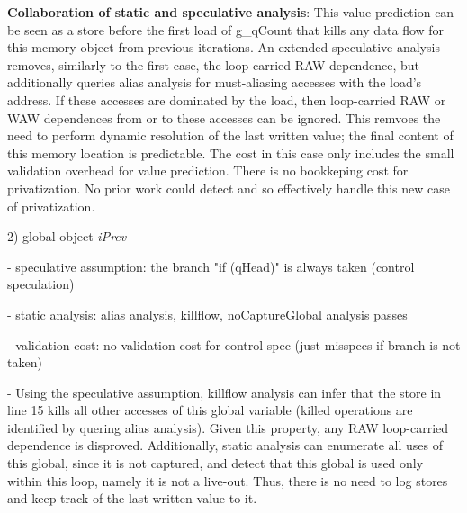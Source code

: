 \textbf{Collaboration of static and speculative analysis}:
%
This value prediction can be seen as a store before the first load of g\_qCount
that kills any data flow for this memory object from previous iterations.
%
An extended speculative analysis removes, similarly to the first case, the
loop-carried RAW dependence, but additionally queries alias analysis for
must-aliasing accesses with the load's address. If these accesses are dominated
by the load, then loop-carried RAW or WAW dependences from or to these accesses
can be ignored.
%
This remvoes the need to perform dynamic resolution of the last written value;
the final content of this memory location is predictable.
%
%
%
The cost in this case only includes the small validation overhead for value
prediction. There is no bookkeping cost for privatization.
%
No prior work could detect and so effectively handle this new case of
privatization.

2) global object \textit{iPrev}

- speculative assumption: the branch "if (qHead)" is always taken (control speculation)

- static analysis: alias analysis, killflow, noCaptureGlobal analysis passes

- validation cost: no validation cost for control spec (just misspecs if branch
  is not taken)

- Using the speculative assumption, killflow analysis can infer that the store
  in line 15 kills all other accesses of this global
variable (killed operations are identified by quering alias analysis). Given this
property, any RAW loop-carried dependence is disproved.  Additionally, static
analysis can enumerate all uses of this global, since it is not captured, and
detect that this global is used only within this loop, namely it is not a
live-out.  Thus, there is no need to log stores and keep track of the last
written value to it.


